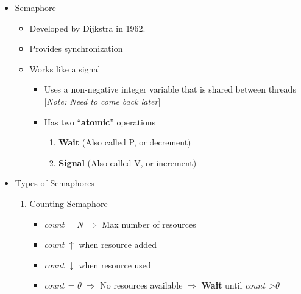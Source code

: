 \documentclass[12pt]{article}
\begin{document}
\begin{itemize}
    \item Semaphore
    \begin{itemize}
        \item Developed by Dijkstra in 1962.
        \item Provides synchronization
        \item Works like a signal
        \begin{itemize}
            \item Uses a non-negative integer variable that is shared between threads
            [\textit{Note: Need to come back later}]
            \item Has two ``\textbf{atomic}'' operations
            \begin{enumerate}[1.]
                \item \textbf{Wait} (Also called P, or decrement)
                \item \textbf{Signal} (Also called V, or increment)
            \end{enumerate}
        \end{itemize}
    \end{itemize}

    \item Types of Semaphores
    \begin{enumerate}[1.]
        \item Counting Semaphore
        \begin{itemize}
            \item \textit{count = N} $\Rightarrow$ Max number of resources
            \item \textit{count} $\uparrow$ when resource added
            \item \textit{count} $\downarrow$ when resource used
            \item \textit{count = 0} $\Rightarrow$ No resources available $\Rightarrow$ \textbf{Wait} until \textit{count \textgreater 0}
        \end{itemize}


\end{enumerate}
\end{itemize}
\end{document}
